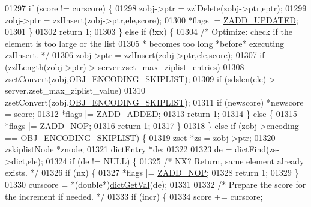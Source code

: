 \begin{DoxyCode}
01297             \textcolor{keywordflow}{if} (score != curscore) \{
01298                 zobj->ptr = zzlDelete(zobj->ptr,eptr);
01299                 zobj->ptr = zzlInsert(zobj->ptr,ele,score);
01300                 *flags |= \hyperlink{server_8h_aabb6bb7a2a2e73ab9fcda97cf704761b}{ZADD\_UPDATED};
01301             \}
01302             \textcolor{keywordflow}{return} 1;
01303         \} \textcolor{keywordflow}{else} \textcolor{keywordflow}{if} (!xx) \{
01304             \textcolor{comment}{/* Optimize: check if the element is too large or the list}
01305 \textcolor{comment}{             * becomes too long *before* executing zzlInsert. */}
01306             zobj->ptr = zzlInsert(zobj->ptr,ele,score);
01307             \textcolor{keywordflow}{if} (zzlLength(zobj->ptr) > server.zset\_max\_ziplist\_entries)
01308                 zsetConvert(zobj,\hyperlink{server_8h_acfb35db5cb30ed113ed23aeb1a224c4c}{OBJ\_ENCODING\_SKIPLIST});
01309             \textcolor{keywordflow}{if} (sdslen(ele) > server.zset\_max\_ziplist\_value)
01310                 zsetConvert(zobj,\hyperlink{server_8h_acfb35db5cb30ed113ed23aeb1a224c4c}{OBJ\_ENCODING\_SKIPLIST});
01311             \textcolor{keywordflow}{if} (newscore) *newscore = score;
01312             *flags |= \hyperlink{server_8h_a2c0f3e2c3a5c73496b732648c69eda18}{ZADD\_ADDED};
01313             \textcolor{keywordflow}{return} 1;
01314         \} \textcolor{keywordflow}{else} \{
01315             *flags |= \hyperlink{server_8h_afd0096ac4bedddb9b0b7f27396839c06}{ZADD\_NOP};
01316             \textcolor{keywordflow}{return} 1;
01317         \}
01318     \} \textcolor{keywordflow}{else} \textcolor{keywordflow}{if} (zobj->encoding == \hyperlink{server_8h_acfb35db5cb30ed113ed23aeb1a224c4c}{OBJ\_ENCODING\_SKIPLIST}) \{
01319         zset *zs = zobj->ptr;
01320         zskiplistNode *znode;
01321         dictEntry *de;
01322 
01323         de = dictFind(zs->dict,ele);
01324         \textcolor{keywordflow}{if} (de != NULL) \{
01325             \textcolor{comment}{/* NX? Return, same element already exists. */}
01326             \textcolor{keywordflow}{if} (nx) \{
01327                 *flags |= \hyperlink{server_8h_afd0096ac4bedddb9b0b7f27396839c06}{ZADD\_NOP};
01328                 \textcolor{keywordflow}{return} 1;
01329             \}
01330             curscore = *(\textcolor{keywordtype}{double}*)\hyperlink{dict_8h_ae8d2cc391873b2bea2b87c4f80f43120}{dictGetVal}(de);
01331 
01332             \textcolor{comment}{/* Prepare the score for the increment if needed. */}
01333             \textcolor{keywordflow}{if} (incr) \{
01334                 score += curscore;

\end{DoxyCode}
